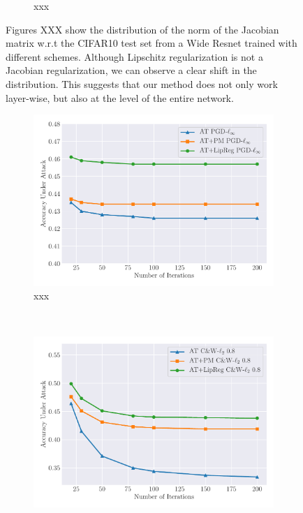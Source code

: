 \begin{figure}[h]
\begin{subfigure}[b]{\textwidth}
      \caption{xxx}
      \label{figure:ch5-jacobian_distribution_v2}
   \end{subfigure}
   \caption{Figures XXX show the distribution of the norm of the Jacobian matrix w.r.t the CIFAR10 test set from a Wide Resnet trained with different schemes. Although Lipschitz regularization is not a Jacobian regularization, we can observe a clear shift in the distribution. This suggests that our method does not only work layer-wise, but also at the level of the entire network.}
\end{figure}


\begin{figure}[h]
   \centering
   \begin{subfigure}[b]{\textwidth}
     \centering
     \includegraphics[width=\scalefigure\textwidth]{figures/main/ch5-lipschitz_regularization/attacks_iter_pgd.pdf}
     \caption{xxx}
     \label{figure:ch5-attacks_pgd}
   \end{subfigure}
   \\[2cm]
   \begin{subfigure}[b]{\textwidth}
      \centering
      \includegraphics[width=\scalefigure\textwidth]{figures/main/ch5-lipschitz_regularization/attacks_iter_cw.pdf}

\end{subfigure}
\end{figure}

